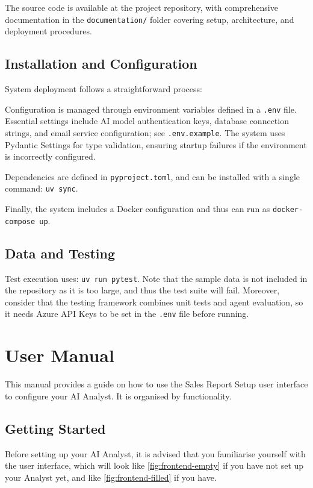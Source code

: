 \documentclass[a4paper]{report}
\begin{document}
The source code is available at the project repository, with comprehensive documentation in the \texttt{documentation/} folder covering setup, architecture, and deployment procedures.

\section{Installation and Configuration}

System deployment follows a straightforward process:

Configuration is managed through environment variables defined in a \texttt{.env} file. Essential settings include AI model authentication keys, database connection strings, and email service configuration; see \texttt{.env.example}. The system uses Pydantic Settings for type validation, ensuring startup failures if the environment is incorrectly configured.

Dependencies are defined in \texttt{pyproject.toml}, and can be installed with a single command: \texttt{uv sync}.

Finally, the system includes a Docker configuration and thus can run as
\texttt{docker-compose up}.

\section{Data and Testing}

Test execution uses: \texttt{uv run pytest}. Note that the sample data is not included in the repository as it is too large, and thus the test suite will fail. Moreover, consider that the testing framework combines unit tests and agent evaluation, so it needs Azure API Keys to be set in the \texttt{.env} file before running.

\chapter{User Manual}
\label{annex:user-manual}

This manual provides a guide on how to use the Sales Report Setup user interface to configure your AI Analyst. It is organised by functionality.

\section{Getting Started}

Before setting up your AI Analyst, it is advised that you familiarise yourself with the user interface, which will look like \autoref{fig:frontend-empty} if you have not set up your Analyst yet, and like \autoref{fig:frontend-filled} if you have.
\end{document}
